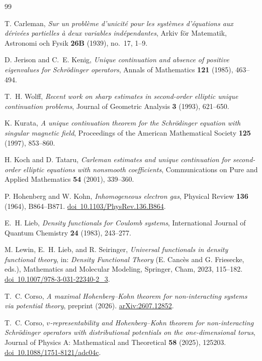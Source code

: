 \documentclass[final,reqno]{amsart}
\theoremstyle{remark}
\begin{document}
\enlargethispage{3\baselineskip}
\begin{thebibliography}{99}

T. Carleman,
\emph{Sur un probl\`eme d'unicit\'e pour les syst\`emes d'\'equations
aux d\'eriv\'ees partielles \`a deux variables ind\'ependantes},
Arkiv f\"or Matematik, Astronomi och Fysik \textbf{26B} (1939), no.~17, 1--9.

D. Jerison and C.~E. Kenig,
\emph{Unique continuation and absence of positive eigenvalues for
Schr\"odinger operators},
Annals of Mathematics \textbf{121} (1985), 463--494.

T.~H. Wolff,
\emph{Recent work on sharp estimates in second-order elliptic unique
continuation problems},
Journal of Geometric Analysis \textbf{3} (1993), 621--650.

K. Kurata,
\emph{A unique continuation theorem for the Schr\"odinger equation with
singular magnetic field},
Proceedings of the American Mathematical Society \textbf{125} (1997),
853--860.

H. Koch and D. Tataru,
\emph{Carleman estimates and unique continuation for second-order
elliptic equations with nonsmooth coefficients},
Communications on Pure and Applied Mathematics \textbf{54} (2001),
339--360.

P. Hohenberg and W. Kohn,
\emph{Inhomogeneous electron gas},
Physical Review \textbf{136} (1964), B864--B871.
\href{https://doi.org/10.1103/PhysRev.136.B864}{doi\ 10.1103/PhysRev.136.B864}.

E.~H. Lieb,
\emph{Density functionals for Coulomb systems},
International Journal of Quantum Chemistry \textbf{24} (1983), 243--277.

M. Lewin, E.~H. Lieb, and R. Seiringer,
\emph{Universal functionals in density functional theory},
in: \emph{Density Functional Theory} (E. Canc\`es and G. Friesecke, eds.),
Mathematics and Molecular Modeling, Springer, Cham, 2023, 115--182.
\href{https://doi.org/10.1007/978-3-031-22340-2_3}{doi\ 10.1007/978-3-031-22340-2\_3}.

T.~C. Corso,
\emph{A maximal Hohenberg--Kohn theorem for non-interacting systems via
potential theory},
preprint (2026).
\href{https://arxiv.org/abs/2607.12852}{arXiv:2607.12852}.

T.~C. Corso,
\emph{$v$-representability and Hohenberg--Kohn theorem for
non-interacting Schr\"odinger operators with distributional potentials
on the one-dimensional torus},
Journal of Physics A: Mathematical and Theoretical \textbf{58} (2025),
125203.
\href{https://doi.org/10.1088/1751-8121/adc04c}{doi\ 10.1088/1751-8121/adc04c}.


\end{thebibliography}
\end{document}

